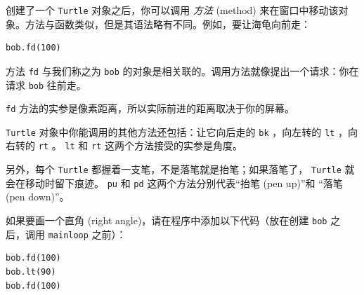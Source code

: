 创建了一个 \lstinline{Turtle} 对象之后，你可以调用 \emph{方法} (method) 来在窗口中移动该对象。方法与函数类似，但是其语法略有不同。例如，要让海龟向前走：

\begin{lstlisting}
bob.fd(100)
\end{lstlisting}


方法 \lstinline{fd} 与我们称之为 \lstinline{bob} 的对象是相关联的。调用方法就像提出一个请求：你在请求 \lstinline{bob} 往前走。


\lstinline{fd} 方法的实参是像素距离，所以实际前进的距离取决于你的屏幕。


\lstinline{Turtle} 对象中你能调用的其他方法还包括：让它向后走的 \lstinline{bk} ，向左转的 \lstinline{lt} ，向右转的 \lstinline{rt} 。 \lstinline{lt} 和 \lstinline{rt} 这两个方法接受的实参是角度。


另外，每个 \lstinline{Turtle} 都握着一支笔，不是落笔就是抬笔；如果落笔了， \lstinline{Turtle} 就会在移动时留下痕迹。 \lstinline{pu} 和 \lstinline{pd} 这两个方法分别代表``抬笔 (pen up)''和 ``落笔 (pen down)''。


如果要画一个直角 (right angle)，请在程序中添加以下代码（放在创建 \lstinline{bob} 之后，调用 \lstinline{mainloop} 之前）：

\begin{lstlisting}
bob.fd(100)
bob.lt(90)
bob.fd(100)
\end{lstlisting}


